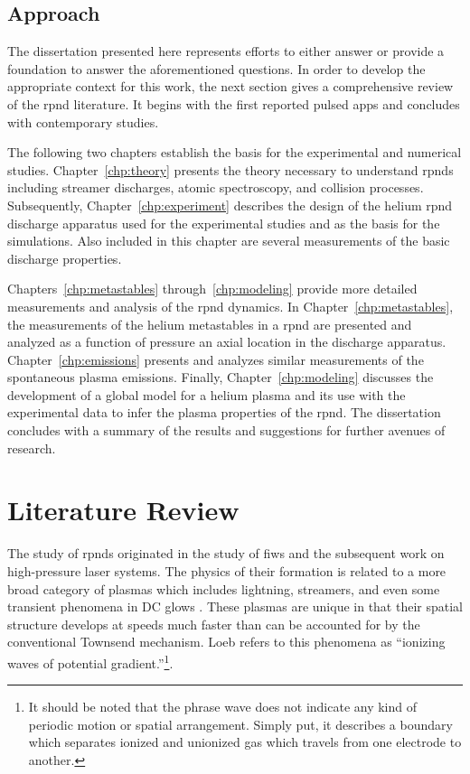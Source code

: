 \subsection{Approach}

The dissertation presented here represents efforts to either answer or provide a
foundation to answer the aforementioned questions. In order to develop the
appropriate context for this work, the next section gives a comprehensive review
of the \acs{rpnd} literature. It begins with the first reported pulsed
\acs{app}s and concludes with contemporary studies.

The following two chapters establish the basis for the experimental and
numerical studies. Chapter~\ref{chp:theory} presents the theory necessary to
understand \acs{rpnd}s including streamer discharges, atomic spectroscopy, and
collision processes. Subsequently, Chapter~\ref{chp:experiment} describes the
design of the helium \acs{rpnd} discharge apparatus used for the experimental
studies and as the basis for the simulations. Also included in this chapter are
several measurements of the basic discharge properties.

Chapters~\ref{chp:metastables} through~\ref{chp:modeling} provide more detailed
measurements and analysis of the \acs{rpnd} dynamics. In
Chapter~\ref{chp:metastables}, the measurements of the helium metastables in a
\acs{rpnd} are presented and analyzed as a function of pressure an axial
location in the discharge apparatus. Chapter~\ref{chp:emissions} presents and
analyzes similar measurements of the spontaneous plasma emissions. Finally,
Chapter~\ref{chp:modeling} discusses the development of a global model for a
helium plasma and its use with the experimental data to infer the plasma
properties of the \acs{rpnd}. The dissertation concludes with a summary of the
results and suggestions for further avenues of research.

\section{Literature Review}

The study of \acs{rpnd}s originated in the study of \acs{fiw}s and the
subsequent work on high-pressure laser systems. The physics of their formation
is related to a more broad category of plasmas which includes lightning,
streamers, and even some transient phenomena in DC glows \cite{Loeb1965}. These
plasmas are unique in that their spatial structure develops at speeds much
faster than can be accounted for by the conventional Townsend mechanism. Loeb
refers to this phenomena as ``ionizing waves of potential
gradient.''\footnote{It should be noted that the phrase wave does not indicate
any kind of periodic motion or spatial arrangement. Simply put, it describes a
boundary which separates ionized and unionized gas which travels from one
electrode to another.}.

